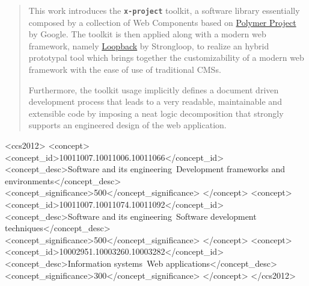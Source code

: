 \documentclass{sig-alternate}
\newcommand{\brand}[1]{\textbf{\tt #1}}
\begin{document}
\begin{abstract}
This work introduces the \brand{x-project} toolkit, a software library essentially composed by a collection of Web Components based on \href{https://www.polymer-project.org}{Polymer Project} by Google. The toolkit is then applied along with a modern web framework, namely \href{http://loopback.io/}{Loopback} by Strongloop, to realize an hybrid prototypal tool which brings together the customizability of a modern web framework with the ease of use of traditional CMSs.

Furthermore, the toolkit usage implicitly defines a document driven development process that leads to a very readable, maintainable and extensible code by imposing a neat logic decomposition that strongly supports an engineered design of the web application.
\end{abstract}


%
%

\begin{CCSXML}
<ccs2012>
<concept>
<concept_id>10011007.10011006.10011066</concept_id>
<concept_desc>Software and its engineering~Development frameworks and environments</concept_desc>
<concept_significance>500</concept_significance>
</concept>
<concept>
<concept_id>10011007.10011074.10011092</concept_id>
<concept_desc>Software and its engineering~Software development techniques</concept_desc>
<concept_significance>500</concept_significance>
</concept>
<concept>
<concept_id>10002951.10003260.10003282</concept_id>
<concept_desc>Information systems~Web applications</concept_desc>
<concept_significance>300</concept_significance>
</concept>
</ccs2012>
\end{CCSXML}


%
%

%
%
\printccsdesc












%




\end{document}
